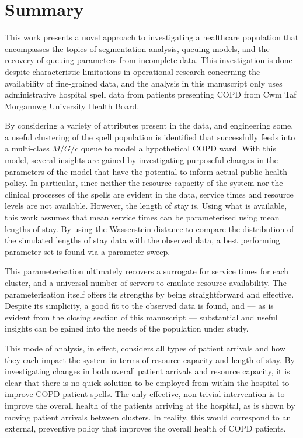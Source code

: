 \documentclass[]{interact}
\theoremstyle{plain}%
\theoremstyle{definition}
\theoremstyle{remark}
\newcommand{\ctmuhb}{Cwm Taf Morgannwg University Health Board}
\begin{document}
\section{Summary}\label{sec:summary}

This work presents a novel approach to investigating a healthcare population
that encompasses the topics of segmentation analysis, queuing models, and the
recovery of queuing parameters from incomplete data. This investigation is done
despite characteristic limitations in operational research concerning the
availability of fine-grained data, and the analysis in this manuscript only uses
administrative hospital spell data from patients presenting COPD from \ctmuhb.

By considering a variety of attributes present in the data, and engineering
some, a useful clustering of the spell population is identified that
successfully feeds into a multi-class \(M/G/c\) queue to model a hypothetical
COPD ward. With this model, several insights are gained by investigating
purposeful changes in the parameters of the model that have the potential to
inform actual public health policy. In particular, since neither the resource
capacity of the system nor the clinical processes of the spells are evident in
the data, service times and resource levels are not available. However, the
length of stay is. Using what is available, this work assumes that mean service
times can be parameterised using mean lengths of stay. By using the Wasserstein
distance to compare the distribution of the simulated lengths of stay data with
the observed data, a best performing parameter set is found via a parameter
sweep.

This parameterisation ultimately recovers a surrogate for service times for each
cluster, and a universal number of servers to emulate resource availability. The
parameterisation itself offers its strengths by being straightforward and
effective. Despite its simplicity, a good fit to the observed data is found,
and --- as is evident from the closing section of this manuscript --- substantial
and useful insights can be gained into the needs of the population under study.

This mode of analysis, in effect, considers all types of patient arrivals and
how they each impact the system in terms of resource capacity and length of
stay. By investigating changes in both overall patient arrivals and resource
capacity, it is clear that there is no quick solution to be employed from within
the hospital to improve COPD patient spells. The only effective, non-trivial
intervention is to improve the overall health of the patients arriving at the
hospital, as is shown by moving patient arrivals between clusters. In reality,
this would correspond to an external, preventive policy that improves the
overall health of COPD patients.



\end{document}
